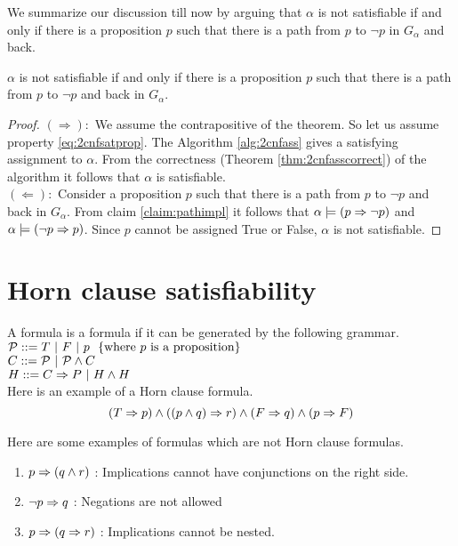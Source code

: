 We summarize our discussion till now by arguing that $\alpha$ is not satisfiable if and only if there is a proposition $p$ such that there is a path from $p$ to $\neg p$ in $G_{\alpha}$ and back.
\begin{theorem}
\label{thm:2cnfsat}
$\alpha$ is not satisfiable if and only if there is a proposition $p$ such that there is a path from $p$ to $\neg p$ and back in $G_{\alpha}$.
\end{theorem}
\begin{proof}
$(\Rightarrow):$ We assume the contrapositive of the theorem. So let us assume property \ref{eq:2cnfsatprop}. The Algorithm \ref{alg:2cnfass} gives a satisfying assignment to $\alpha$. From the correctness (Theorem \ref{thm:2cnfasscorrect}) of the algorithm it follows that $\alpha$ is satisfiable. \\
$(\Leftarrow):$ Consider a proposition $p$ such that there is a path from $p$ to $\neg p$ and back in $G_{\alpha}$. From claim \ref{claim:pathimpl} it follows that $\alpha \models (p \Rightarrow \neg p)$ and $\alpha \models (\neg p \Rightarrow p)$. Since $p$ cannot be assigned True or False, $\alpha$ is not satisfiable.
\end{proof}

\section{Horn clause satisfiability}
A formula is a  formula if it can be generated by the following grammar. \\
$\mathcal{P} ::= T ~|~ F ~|~ p ~~\{\text {where $p$ is a proposition}\}$ \\
$C ::= \mathcal{P} ~|~ \mathcal{P} \wedge C$ \\
$H ::= C \Rightarrow P ~|~ H \wedge H$ \\

Here is an example of a Horn clause formula.
\[
(T \Rightarrow p) \wedge ((p \wedge q) \Rightarrow r) \wedge (F \Rightarrow q) \wedge (p \Rightarrow F)
\]

Here are some examples of formulas which are not Horn clause formulas. 
\begin{enumerate}
\item $p \Rightarrow (q \wedge r)$ :  Implications cannot have conjunctions on the right side.
\item $\neg p \Rightarrow q$ :  Negations are not allowed
\item $p \Rightarrow (q \Rightarrow r)$ : Implications cannot be nested.
\end{enumerate}

